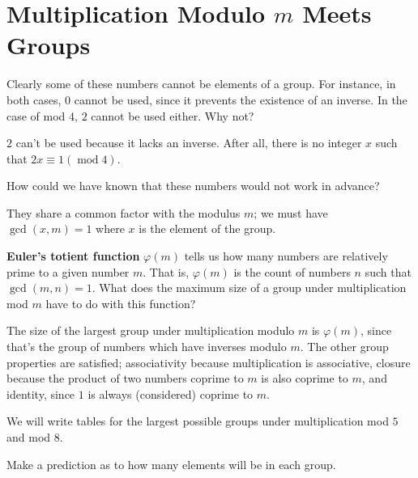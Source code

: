 \documentclass[../key.tex]{subfiles}
\begin{document}
\section{Multiplication Modulo $m$ Meets Groups}

\begin{outer_problem}[start=1]
\item Clearly some of these numbers cannot be elements of a group. For instance, in both cases, $0$ cannot be used, since it prevents the existence of an inverse. In the case of mod $4$, $2$ cannot be used either. Why not?
\end{outer_problem}

$2$ can't be used because it lacks an inverse. After all, there is no integer $x$ such that $2x\equiv 1 (\operatorname{mod} 4)$.

\begin{outer_problem}
\item How could we have known that these numbers would not work in advance?
\end{outer_problem}

They share a common factor with the modulus $m$; we must have $\gcd(x,m)=1$ where $x$ is the element of the group.

\begin{outer_problem}
\item \textbf{Euler's totient function} $\varphi(m)$ tells us how many numbers are relatively prime to a given number $m$. That is, $\varphi(m)$ is the count of numbers $n$ such that $\gcd(m,n)=1$. What does the maximum size of a group under multiplication mod $m$ have to do with this function?
\end{outer_problem}

The size of the largest group under multiplication modulo $m$ is $\varphi(m)$, since that's the group of numbers which have inverses modulo $m$. The other group properties are satisfied; associativity because multiplication is associative, closure because the product of two numbers coprime to $m$ is also coprime to $m$, and identity, since $1$ is always (considered) coprime to $m$.

\begin{outer_problem}
\item We will write tables for the largest possible groups under multiplication mod $5$ and mod $8$.
\end{outer_problem}

\begin{inner_problem}[start=1]
\item Make a prediction as to how many elements will be in each group.
\end{inner_problem}
\end{document}

